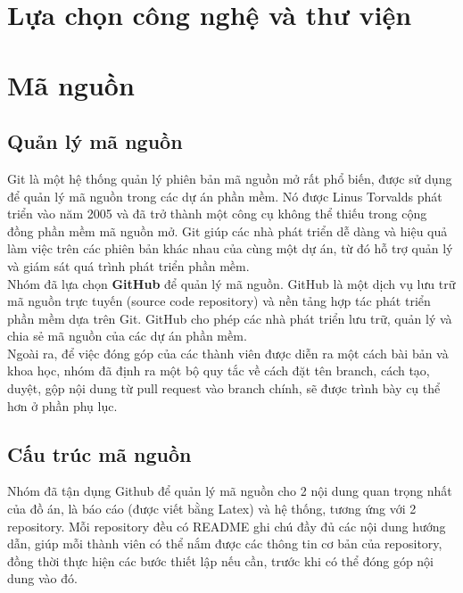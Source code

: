 \section{Lựa chọn công nghệ và thư viện}
\section{Mã nguồn}
\subsection{Quản lý mã nguồn}
\noindent Git là một hệ thống quản lý phiên bản mã nguồn mở rất phổ biến, được sử dụng để quản lý mã nguồn trong các dự án phần mềm. Nó được Linus Torvalds phát triển vào năm 2005 và đã trở thành một công cụ không thể thiếu trong cộng đồng phần mềm mã nguồn mở. Git giúp các nhà phát triển dễ dàng và hiệu quả làm việc trên các phiên bản khác nhau của cùng một dự án, từ đó hỗ trợ quản lý và giám sát quá trình phát triển phần mềm. \\[0.5cm]
Nhóm đã lựa chọn \textbf{GitHub} để quản lý mã nguồn. GitHub là một dịch vụ lưu trữ mã nguồn trực tuyến (source code repository) và nền tảng hợp tác phát triển phần mềm dựa trên Git. GitHub cho phép các nhà phát triển lưu trữ, quản lý và chia sẻ mã nguồn của các dự án phần mềm.\\[0.5cm]
Ngoài ra, để việc đóng góp của các thành viên được diễn ra một cách bài bản và khoa học, nhóm đã định ra một bộ quy tắc về cách đặt tên branch, cách tạo, duyệt, gộp nội dung từ pull request vào branch chính, sẽ được trình bày cụ thể hơn ở phần phụ lục.

\subsection{Cấu trúc mã nguồn}
\noindent Nhóm đã tận dụng Github để quản lý mã nguồn cho 2 nội dung quan trọng nhất của đồ án, là báo cáo (được viết bằng Latex) và hệ thống, tương ứng với 2 repository. Mỗi repository đều có README ghi chú đầy đủ các nội dung hướng dẫn, giúp mỗi thành viên có thể nắm được các thông tin cơ bản của repository, đồng thời thực hiện các bước thiết lập nếu cần, trước khi có thể đóng góp nội dung vào đó.

